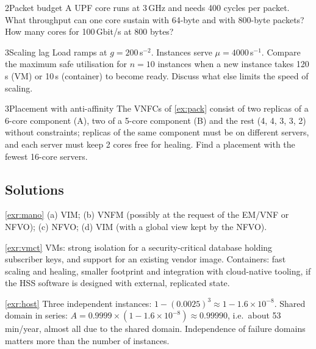 \documentclass[11pt,a4paper]{article}
\begin{document}
\begin{exercisebox}{2}{Packet budget}\label{exr:cycles}
A UPF core runs at 3\,GHz and needs 400 cycles per packet. What throughput can one core sustain with 64-byte and with
800-byte packets? How many cores for 100\,Gbit/s at 800 bytes?
\end{exercisebox}

\begin{exercisebox}{3}{Scaling lag}\label{exr:lag}
Load ramps at $g = 200$\,s$^{-2}$. Instances serve $\mu = 4000$\,s$^{-1}$. Compare the maximum safe utilisation for
$n = 10$ instances when a new instance takes 120\,s (VM) or 10\,s (container) to become ready. Discuss what else limits
the speed of scaling.
\end{exercisebox}

\begin{exercisebox}{3}{Placement with anti-affinity}\label{exr:pack}
The VNFCs of \cref{ex:pack} consist of two replicas of a 6-core component (A), two of a 5-core component (B) and the rest
(4, 4, 3, 3, 2) without constraints; replicas of the same component must be on different servers, and each server must
keep 2 cores free for healing. Find a placement with the fewest 16-core servers.
\end{exercisebox}

\subsection*{Solutions}

\begin{solutionbox}{\ref{exr:mano}}
(a) VIM; (b) VNFM (possibly at the request of the EM/VNF or NFVO); (c) NFVO; (d) VIM (with a global view kept by the NFVO).
\end{solutionbox}

\begin{solutionbox}{\ref{exr:vmct}}
VMs: strong isolation for a security-critical database holding subscriber keys, and support for an existing vendor image.
Containers: fast scaling and healing, smaller footprint and integration with cloud-native tooling, if the HSS software
is designed with external, replicated state.
\end{solutionbox}

\begin{solutionbox}{\ref{exr:host}}
Three independent instances: $1-(0.0025)^3 \approx 1-1.6\times10^{-8}$. Shared domain in series: $A = 0.9999\times(1-1.6\times10^{-8})
\approx 0.99990$, i.e.\ about 53\,min/year, almost all due to the shared domain. Independence of failure domains matters more
than the number of instances.
\end{solutionbox}
\end{document}
